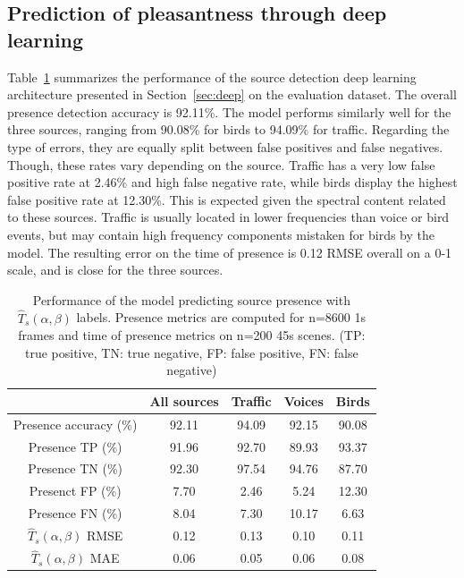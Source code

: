 \documentclass[11pt,a4paper]{article}
\begin{document}
\subsection{Prediction of pleasantness through deep learning}
\label{sec:pred}

Table~\ref{tab:perf_cmp} summarizes the performance of the source detection deep learning architecture presented in Section~\ref{sec:deep} on the evaluation dataset. The overall presence detection accuracy is 92.11\%. The model performs similarly well for the three sources, ranging from 90.08\% for birds to 94.09\% for traffic. Regarding the type of errors, they are equally split between false positives and false negatives. Though, these rates vary depending on the source. Traffic has a very low false positive rate at 2.46\% and high false negative rate, while birds display the highest false positive rate at 12.30\%. This is expected given the spectral content related to these sources. Traffic is usually located in lower frequencies than voice or bird events, but may contain high frequency components mistaken for birds by the model. The resulting error on the time of presence is 0.12 RMSE overall on a 0-1 scale, and is close for the three sources.\\


\begin{table}[t]
\centering
\caption{Performance of the model predicting source presence with $\hat T_s(\alpha, \beta)$ labels. Presence metrics are computed for n=8600 1s frames and time of presence metrics on n=200 45s scenes. (TP: true positive, TN: true negative, FP: false positive, FN: false negative)}
\label{tab:perf_cmp}
\begin{tabular}{ c | c | c c c }
\hline
	 & All sources & Traffic & Voices & Birds \\ \hline
	Presence accuracy (\%) &  92.11 & 94.09 & 92.15 & 90.08 \\
	Presence TP (\%) & 91.96 & 92.70 & 89.93 & 93.37 \\
	Presence TN (\%) & 92.30 & 97.54 & 94.76 & 87.70 \\
	Presenct FP (\%) & 7.70 & 2.46 & 5.24 & 12.30 \\
	Presence FN (\%) & 8.04 & 7.30 & 10.17 & 6.63 \\ \hline
	$\hat T_s(\alpha, \beta)$ RMSE & 0.12 & 0.13 & 0.10 & 0.11 \\
	$\hat T_s(\alpha, \beta)$ MAE & 0.06 & 0.05 & 0.06 & 0.08 \\ \hline
\end{tabular}
\end{table}
\end{document}
